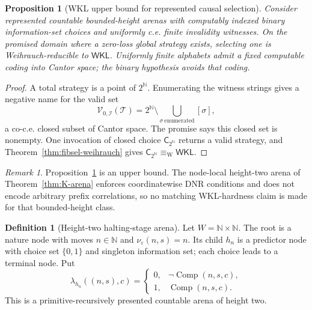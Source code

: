 \documentclass[11pt]{article}
\theoremstyle{plain}
\newtheorem{proposition}[theorem]{Proposition}
\theoremstyle{definition}
\newtheorem{definition}[theorem]{Definition}
\theoremstyle{remark}
\newtheorem{remark}[theorem]{Remark}
\newcommand{\N}{\mathbb{N}}
\begin{document}
\begin{proposition}[WKL upper bound for represented causal selection]
\label{prop:causal-WKL-upper}
Consider represented countable bounded-height arenas with computably indexed
binary information-set choices and uniformly c.e. finite invalidity witnesses.
On the promised domain where a zero-loss global strategy exists, selecting one
is Weihrauch-reducible to $\mathsf{WKL}$. Uniformly finite alphabets admit a
fixed computable coding into Cantor space; the binary hypothesis avoids that
coding.
\end{proposition}

\begin{proof}
A total strategy is a point of $2^\N$. Enumerating the witness strings gives a
negative name for the valid set
\[
\mathscr V_{0,\mathcal I}(\mathcal T)
=2^\N\setminus\bigcup_{\sigma\ \mathrm{enumerated}}[\sigma],
\]
a co-c.e. closed subset of Cantor space. The promise says this closed set is
nonempty. One invocation of closed choice $\mathsf C_{2^\N}$ returns a valid
strategy, and Theorem~\ref{thm:fibsel-weihrauch} gives
$\mathsf C_{2^\N}\equiv_{\mathrm W}\mathsf{WKL}$.
\end{proof}

\begin{remark}
Proposition~\ref{prop:causal-WKL-upper} is an upper bound. The node-local
height-two arena of Theorem~\ref{thm:K-arena} enforces coordinatewise DNR
conditions and does not encode arbitrary prefix correlations, so no matching
WKL-hardness claim is made for that bounded-height class.
\end{remark}

\begin{definition}[Height-two halting-stage arena]
\label{def:K-arena}
Let $W=\N\times\N$. The root is a nature node with moves $n\in\N$ and
$\nu_\varepsilon(n,s)=n$. Its child $h_n$ is a predictor node with choice set
$\{0,1\}$ and singleton information set; each choice leads to a terminal node.
Put
\[
\lambda_{h_n}((n,s),c)=
\begin{cases}
0,&\neg\operatorname{Comp}(n,s,c),\\
1,&\operatorname{Comp}(n,s,c).
\end{cases}
\]
This is a primitive-recursively presented countable arena of height two.
\end{definition}
\end{document}
